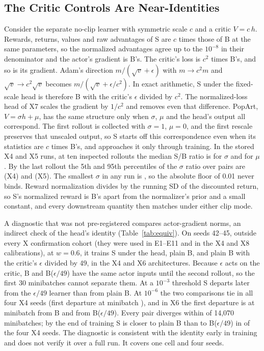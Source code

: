 \subsection{The Critic Controls Are Near-Identities}
\label{app:equiv}
Consider the separate no-clip learner with symmetric scale $c$ and a critic $V=c\,h$. Rewards, returns, values and raw
advantages of S are $c$ times those of B at the same parameters, so the normalized advantages agree up to the $10^{-8}$ in
their denominator and the actor's gradient is B's. The critic's loss is $c^2$ times B's, and so is its gradient. Adam's
direction $m/(\sqrt{v}+\epsilon)$ with $m\to c^2m$ and $\sqrt{v}\to c^2\sqrt{v}$ becomes $m/(\sqrt{v}+\epsilon/c^2)$. In exact
arithmetic, S under the fixed-scale head is therefore B with the critic's $\epsilon$ divided by $c^2$. The normalized-loss
head of X7 scales the gradient by $1/c^2$ and removes even that difference. PopArt, $V=\sigma h+\mu$, has the same
structure only when $\sigma$, $\mu$ and the head's output all correspond. The first rollout is collected with $\sigma=1$,
$\mu=0$, and the first rescale preserves that unscaled output, so S starts off this correspondence even when its
statistics are $c$ times B's, and approaches it only through training. In the stored X4 and X5 runs, at ten inspected
rollouts the median S/B ratio is \VeqvSigMed{} for $\sigma$ and \VeqvMuMed{} for $\mu$. By the last rollout the 5th and 95th
percentiles of the $\sigma$ ratio over pairs are \VeqvSigXfour{} (X4) and \VeqvSigXfive{} (X5). The smallest $\sigma$ in any
run is \VeqvSigMin{}, so the absolute floor of 0.01 never binds. Reward normalization divides by the running SD of the
discounted return, so S's normalized reward is B's apart from the normalizer's prior and a small constant, and every
downstream quantity then matches under either clip mode.

A diagnostic that was not pre-registered compares actor-gradient norms, an indirect check of the head's identity
(Table~\ref{tab:equiv}). On seeds 42--45, outside every X confirmation cohort (they were used in E1--E11 and in the X4 and X8
calibrations), at $w=0.6$, it trains S under the head, plain B, and plain B with the critic's $\epsilon$ divided by 49, in the
X4 and X6 architectures. Because $\epsilon$ acts on the critic, B and B($\epsilon/49$) have the same actor inputs until the
second rollout, so the first 30 minibatches cannot separate them. At a $10^{-3}$ threshold S departs later from the
$\epsilon/49$ learner than from plain B. At $10^{-6}$ the two comparisons tie in all four X4 seeds (first departure at
minibatch \VeqvTie{}), and in X6 the first departure is at minibatch \VeqvSixB{} from B and \VeqvSixE{} from B($\epsilon/49$).
Every pair diverges within \VeqvLastDiv{} of 14,070 minibatches; by the end of training S is closer to plain B than to
B($\epsilon/49$) in \VeqvLateCloser{} of the four X4 seeds. The diagnostic is consistent with the identity early in training and
does not verify it over a full run. It covers one cell and four seeds.

